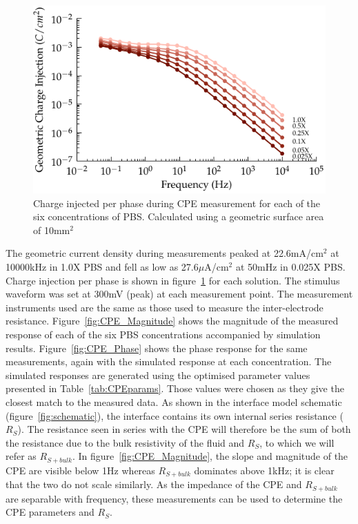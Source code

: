 \documentclass[journal, a4paper]{IEEEtran}
\begin{document}
\begin{figure}
    \begin{center}
        \includegraphics{graphics/chargeInjectionVsFrequency_magnitude}
    \end{center}
    \caption{\color{blue} Charge injected per phase during CPE measurement for each of the six concentrations of PBS. Calculated using a geometric surface area of 10\thinspace mm$^{2}$}
    \label{fig:chargeInjectionVsFrequency}
\end{figure}
{
    \color{blue}
    The geometric current density during measurements peaked at 22.6\thinspace mA/cm$^{2}$ at 10000\thinspace kHz in 1.0X PBS and fell as low as 27.6\thinspace $\mu$A/cm$^{2}$ at 50\thinspace mHz in 0.025X PBS. Charge injection per phase is shown in figure~\ref{fig:chargeInjectionVsFrequency} for each solution.
The stimulus waveform was set at 300\thinspace mV (peak) at each measurement point. The measurement instruments used are the same as those used to measure the inter-electrode resistance.
}
{
    \color{blue}
Figure~\ref{fig:CPE_Magnitude} shows the magnitude of the measured response of each of the six PBS concentrations accompanied by simulation results. Figure~\ref{fig:CPE_Phase} shows the phase response for the same measurements, again with the simulated response at each concentration. The simulated responses are generated using the optimised parameter values presented in Table~\ref{tab:CPEparams}. Those values were chosen as they give the closest match to the measured data.
}
As shown in the interface model schematic (figure~\ref{fig:schematic}), the interface contains its own internal series resistance ($R_{S}$). The resistance seen in series with the CPE will therefore be the sum of both the resistance due to the bulk resistivity of the fluid and $R_{S}$, to which we will refer as $R_{S+bulk}$.
In figure~\ref{fig:CPE_Magnitude}, the slope and magnitude of the CPE are visible below 1\thinspace Hz whereas $R_{S+bulk}$  dominates above 1\thinspace kHz; it is clear that the two do not scale similarly.
As the impedance of the CPE and $R_{S+bulk}$ are separable with frequency, these measurements can be used to determine the CPE parameters and $R_{S}$.
\end{document}
